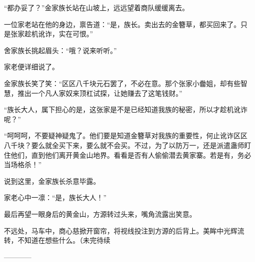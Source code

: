 \begin{this_body}
“都办妥了？”金家族长站在山坡上，远远望着商队缓缓离去。

一位家老站在他的身边，禀告道：“是，族长。卖出去的金簪草，都买回来了。只是张家趁机讹诈，实在可恨。”

舍家族长挑起眉头：“哦？说来听听。”

家老便详细说了。

金家族长笑了笑：“区区八千块元石罢了，不必在意。那个张家小齤姐，却有些智慧，推出一个凡人家奴来顶杠试探，让她赚去了这笔钱财。”

“族长大人，属下担心的是，这张家是不是已经知道我族的秘密，所以才趁机讹诈呢？”

“呵呵呵，不要疑神疑鬼了。他们要是知道金簪草对我族的重要性，何止讹诈区区八千块？要么就全买下来，要么就不会买。不过，为了以防万一，还是派遣蛊师盯住他们，直到他们离开黄金山地界。看看是否有人偷偷潜去黄家寨。若是有，务必当场格杀！”

说到这里，金家族长杀意毕露。

家老心中一凛：“是，族长大人！”

最后再望一眼身后的黄金山，方源转过头来，嘴角流露出笑意。

不远处，马车中，商心慈掀开窗帘，将视线投注到方源的后背上。美眸中光辉流转，不知道在想些什么。（未完待续

------------

\end{this_body}

